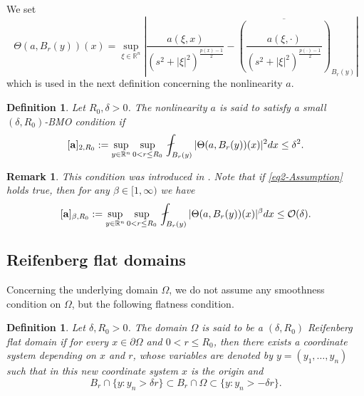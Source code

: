 \documentclass[a4paper,10pt]{amsart}
\newtheorem{defn}[thm]{Definition}
\newtheorem{rem}[thm]{Remark}
\newcommand{\pd}{p(\cdot)}
\newcommand{\px}{p(x)}
\newcommand{\f}{\frac}
\newcommand{\Om}{\Omega}
\newcommand{\vc}{\infty}
\newcommand{\Rn}{\mathbb{R}^n}
\begin{document}
We set
$$
\Theta(a,B_r(y))(x)=\sup_{\xi\in \Rn}\left|\f{a(\xi,x)}{(s^2+|\xi|^2)^{\f{\px-1}{2}}}-\overline{\left(\f{a(\xi,\cdot)}{(s^2+|\xi|^2)^{\f{\pd-1}{2}}}\right)}_{B_r(y)}\right|
$$
which is used in the next definition concerning the nonlinearity $a$.
\begin{defn}
	Let $R_0,\delta>0$. The nonlinearity $a$ is said to satisfy a small $(\delta, R_0)$-BMO condition if 
	\begin{equation}\label{eq2-Assumption}
	[{\bf a}]_{2,R_0}:=\sup_{y\in \mathbb{R}^n}\sup_{0<r\leq R_0}\,\fint_{B_{r}(y)}|\Theta(a,B_r(y))(x)|^2dx\leq \delta^2.
	\end{equation}
\end{defn}
\begin{rem}
	\label{rem1}
	This condition was introduced in \cite{BOR}. Note that if \eqref{eq2-Assumption} holds true, then for any $\beta\in [1,\vc)$ we have
	$$
	[{\bf a}]_{\beta,R_0}:=\sup_{y\in \mathbb{R}^n}\sup_{0<r\leq R_0}\,\fint_{B_{r}(y)}|\Theta(a,B_r(y))(x)|^\beta dx\leq \mathcal{O}(\delta).
	$$
\end{rem}
\medskip

\subsection{Reifenberg flat domains}
Concerning  the underlying domain $\Omega$, we do not assume any smoothness condition on $\Omega$, but the following  flatness condition.
\begin{defn}\label{defn2}
	Let $\delta, R_0>0$. The domain $\Om$ is said to be a $(\delta, R_0)$ Reifenberg flat domain if for every $x\in \partial\Om$ and $0<r\leq R_0$, then there exists a coordinate system depending on $x$ and $r$, whose variables are denoted by $y=(y_1,\dots,y_n)$ such that in this new coordinate system $x$ is the origin and
	\begin{equation}\label{eq1-Assumption}
	B_{r}\cap\{y: y_n>\delta r\}\subset B_{r}\cap \Omega \subset \{y: y_n>-\delta r\}.
	\end{equation}
\end{defn}
\end{document}
